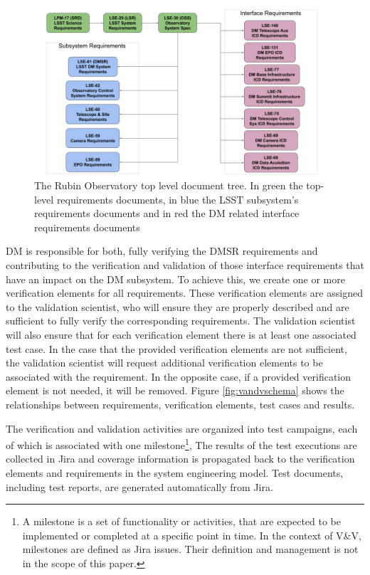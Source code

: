 \begin{figure}
\begin{center}
\includegraphics[width=\textwidth]{imgs/TopLevelDocTree.png}
 \caption{The Rubin Observatory top level document tree. In green the top-level requirements documents,
in blue the LSST subsystem's requirements documents and in red the DM related interface requirements documents }
 \label{fig:topdoctree}
\end{center}
\end{figure}

DM is responsible for both, fully verifying the DMSR requirements and contributing to the verification and validation of those interface requirements that have an impact on the DM subsystem.
To achieve this, we create one or more verification elements for all requirements.
These verification elements are assigned to the validation scientist,
who will ensure they are properly described and are sufficient to fully verify the corresponding requirements.
The validation scientist will also ensure that for each verification element there is at least one associated test case.
In the case that the provided verification elements are not sufficient, the validation scientist will request additional verification elements to be associated with the requirement.
In the opposite case, if a provided verification element is not needed, it will be removed.
Figure \ref{fig:vandvschema} shows the relationships between requirements, verification elements, test cases and results.

The verification and validation activities are organized into test campaigns, each of which is associated with one milestone\footnote{A 
milestone is a set of functionality or activities, that are expected to be implemented or completed at a specific point in time. 
In the context of V\&V, milestones are defined as Jira issues. Their definition and management is not in the scope of this paper.},
The results of the test executions are collected in Jira and coverage information is propagated back to the verification elements and requirements in the system engineering model.
Test documents, including test reports, are generated automatically from Jira.

